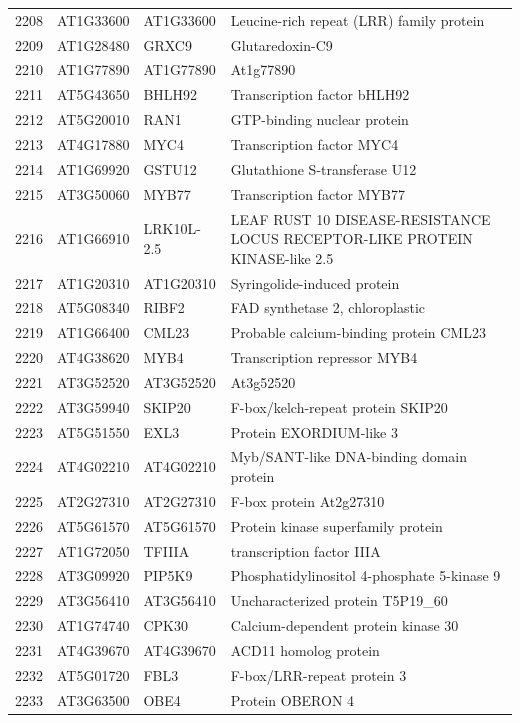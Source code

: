 \documentclass[11pt]{article}
\begin{document}
\begin{center}
\begin{tabular}{rlll}
2208 & AT1G33600 & AT1G33600 & Leucine-rich repeat (LRR) family protein\\
2209 & AT1G28480 & GRXC9 & Glutaredoxin-C9\\
2210 & AT1G77890 & AT1G77890 & At1g77890\\
2211 & AT5G43650 & BHLH92 & Transcription factor bHLH92\\
2212 & AT5G20010 & RAN1 & GTP-binding nuclear protein\\
2213 & AT4G17880 & MYC4 & Transcription factor MYC4\\
2214 & AT1G69920 & GSTU12 & Glutathione S-transferase U12\\
2215 & AT3G50060 & MYB77 & Transcription factor MYB77\\
2216 & AT1G66910 & LRK10L-2.5 & LEAF RUST 10 DISEASE-RESISTANCE LOCUS RECEPTOR-LIKE PROTEIN KINASE-like 2.5\\
2217 & AT1G20310 & AT1G20310 & Syringolide-induced protein\\
2218 & AT5G08340 & RIBF2 & FAD synthetase 2, chloroplastic\\
2219 & AT1G66400 & CML23 & Probable calcium-binding protein CML23\\
2220 & AT4G38620 & MYB4 & Transcription repressor MYB4\\
2221 & AT3G52520 & AT3G52520 & At3g52520\\
2222 & AT3G59940 & SKIP20 & F-box/kelch-repeat protein SKIP20\\
2223 & AT5G51550 & EXL3 & Protein EXORDIUM-like 3\\
2224 & AT4G02210 & AT4G02210 & Myb/SANT-like DNA-binding domain protein\\
2225 & AT2G27310 & AT2G27310 & F-box protein At2g27310\\
2226 & AT5G61570 & AT5G61570 & Protein kinase superfamily protein\\
2227 & AT1G72050 & TFIIIA & transcription factor IIIA\\
2228 & AT3G09920 & PIP5K9 & Phosphatidylinositol 4-phosphate 5-kinase 9\\
2229 & AT3G56410 & AT3G56410 & Uncharacterized protein T5P19\_60\\
2230 & AT1G74740 & CPK30 & Calcium-dependent protein kinase 30\\
2231 & AT4G39670 & AT4G39670 & ACD11 homolog protein\\
2232 & AT5G01720 & FBL3 & F-box/LRR-repeat protein 3\\
2233 & AT3G63500 & OBE4 & Protein OBERON 4\\

\end{tabular}
\end{center}
\end{document}
